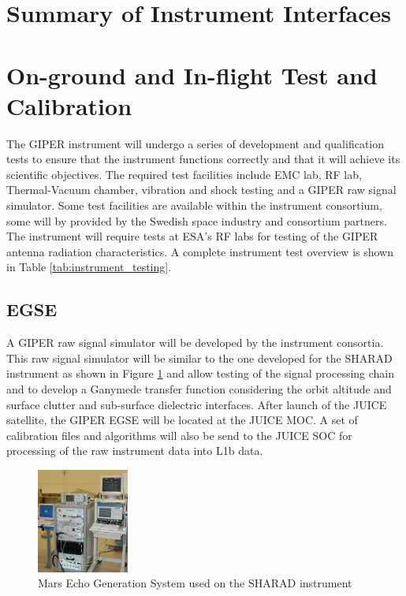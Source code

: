 \section{Summary of Instrument Interfaces}
%
\section{On-ground and In-flight Test and Calibration}
%
The \ac{GIPER} instrument will undergo a series of development and qualification tests to ensure that the instrument functions correctly and that it will achieve its scientific objectives. The required test facilities include \ac{EMC} lab, RF lab, Thermal-Vacuum chamber, vibration and shock testing and a \ac{GIPER} raw signal simulator. Some test facilities are available within the instrument consortium, some will by provided by the Swedish space industry and consortium partners. The instrument will require tests at ESA's \ac{RF} labs for testing of the \ac{GIPER} antenna radiation characteristics. A complete instrument test overview is shown in Table \ref{tab:instrument_testing}.
%
\subsection{EGSE}
A \ac{GIPER} raw signal simulator will be developed by the instrument consortia. This raw signal simulator will be similar to the one developed for the \ac{SHARAD} instrument\cite{Giovanni} as shown in Figure \ref{fig:MEGS} and allow testing of the signal processing chain and to develop a Ganymede transfer function considering the orbit altitude and surface clutter and sub-surface dielectric interfaces. After launch of the JUICE satellite, the \ac{GIPER} \ac{EGSE} will be located at the JUICE \ac{MOC}. A set of calibration files and algorithms will also be send to the JUICE \ac{SOC} for processing of the raw instrument data into L1b data.
%
\begin{figure}
\centering
\includegraphics[width=0.27\textwidth]{Figures/MEGS}
\caption[caption]{Mars Echo Generation System used on the SHARAD instrument\cite{MEGS}}
\label{fig:MEGS}
\end{figure}
%
